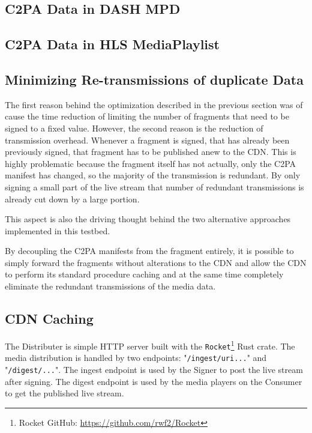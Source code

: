 \subsection{C2PA Data in DASH MPD\label{sec:mpd}}


\subsection{C2PA Data in HLS MediaPlaylist\label{sec:media_playlist}}


\subsection{Minimizing Re-transmissions of duplicate Data}

The first reason behind the optimization described in the previous section was of cause the time reduction of limiting the number of fragments that need to be signed to a fixed value. However, the second reason is the reduction of transmission overhead. Whenever a fragment is signed, that has already been previously signed, that fragment has to be published anew to the CDN. This is highly problematic because the fragment itself has not actually, only the C2PA manifest has changed, so the majority of the transmission is redundant. By only signing a small part of the live stream that number of redundant transmissions is already cut down by a large portion.

This aspect is also the driving thought behind the two alternative approaches implemented in this testbed.

By decoupling the C2PA manifests from the fragment entirely, it is possible to simply forward the fragments without alterations to the CDN and allow the CDN to perform its standard procedure caching and at the same time completely eliminate the redundant transmissions of the media data.

\subsection{CDN Caching}

The Distributer is simple HTTP server built with the \texttt{Rocket}\footnote{Rocket GitHub: \url{https://github.com/rwf2/Rocket}} Rust crate. The media distribution is handled by two endpoints: "\texttt{/ingest/uri...}" and "\texttt{/digest/...}". The ingest endpoint is used by the Signer to post the live stream after signing. The digest endpoint is used by the media players on the Consumer to get the published live stream.

